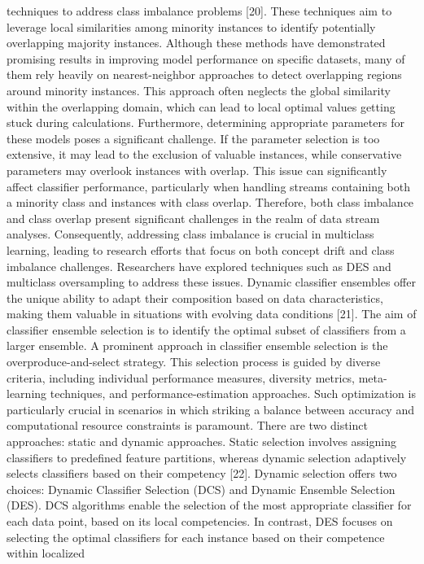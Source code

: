 techniques to address class imbalance problems [20]. These techniques aim to leverage local similarities among minority instances to
identify potentially overlapping majority instances. Although these methods have demonstrated promising results in improving model
performance on specific datasets, many of them rely heavily on nearest-neighbor approaches to detect overlapping regions around
minority instances. This approach often neglects the global similarity within the overlapping domain, which can lead to local optimal
values getting stuck during calculations. Furthermore, determining appropriate parameters for these models poses a significant
challenge. If the parameter selection is too extensive, it may lead to the exclusion of valuable instances, while conservative parameters
may overlook instances with overlap. This issue can significantly affect classifier performance, particularly when handling streams
containing both a minority class and instances with class overlap. Therefore, both class imbalance and class overlap present significant
challenges in the realm of data stream analyses. Consequently, addressing class imbalance is crucial in multiclass learning, leading to
research efforts that focus on both concept drift and class imbalance challenges. Researchers have explored techniques such as DES and
multiclass oversampling to address these issues.
Dynamic classifier ensembles offer the unique ability to adapt their composition based on data characteristics, making them
valuable in situations with evolving data conditions [21]. The aim of classifier ensemble selection is to identify the optimal subset of
classifiers from a larger ensemble. A prominent approach in classifier ensemble selection is the overproduce-and-select strategy. This
selection process is guided by diverse criteria, including individual performance measures, diversity metrics, meta-learning techniques,
and performance-estimation approaches. Such optimization is particularly crucial in scenarios in which striking a balance between
accuracy and computational resource constraints is paramount. There are two distinct approaches: static and dynamic approaches.
Static selection involves assigning classifiers to predefined feature partitions, whereas dynamic selection adaptively selects classifiers
based on their competency [22]. Dynamic selection offers two choices: Dynamic Classifier Selection (DCS) and Dynamic Ensemble
Selection (DES). DCS algorithms enable the selection of the most appropriate classifier for each data point, based on its local competencies. In contrast, DES focuses on selecting the optimal classifiers for each instance based on their competence within localized
